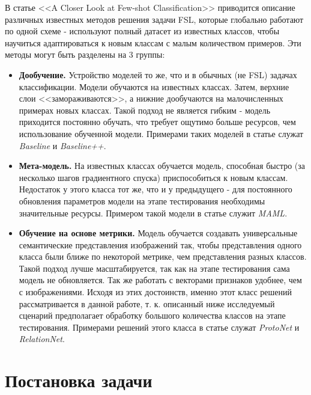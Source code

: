 \documentclass[a4paper, 12pt]{report}
\begin{document}
В статье <<A Closer Look at Few-shot Classification>> \cite{closerlook} приводится описание различных известных методов решения задачи FSL, которые глобально работают по одной схеме - используют полный датасет из известных классов, чтобы научиться адаптироваться к новым классам с малым количеством примеров. Эти методы могут быть разделены на 3 группы:

\begin{itemize}
\item \textbf{Дообучение.} Устройство моделей то же, что и в обычных (не FSL) задачах классификации. Модели обучаются на известных классах. Затем, верхние слои <<замораживаются>>, а нижние дообучаются на малочисленных примерах новых классах. Такой подход не является гибким - модель приходится постоянно обучать, что требует ощутимо больше ресурсов, чем использование обученной модели. Примерами таких моделей в статье служат \textit{Baseline} и \textit{Baseline++}.

\item \textbf{Мета-модель.} На известных классах обучается модель, способная быстро (за несколько шагов градиентного спуска) приспособиться к новым классам. Недостаток у этого класса тот же, что и у предыдущего - для постоянного обновления параметров модели на этапе тестирования необходимы значительные ресурсы. Примером такой модели в статье служит \textit{MAML}.

\item \textbf{Обучение на основе метрики.} Модель обучается создавать универсальные семантические представления изображений так, чтобы представления одного класса были ближе по некоторой метрике, чем представления разных классов. Такой подход лучше масштабируется, так как на этапе тестирования сама модель не обновляется. Так же работать с векторами признаков удобнее, чем с изображениями. Исходя из этих достоинств, именно этот класс решений рассматривается в данной работе, т. к. описанный ниже исследуемый сценарий предполагает обработку большого количества классов на этапе тестирования. Примерами решений этого класса в статье служат \textit{ProtoNet} и \textit{RelationNet}.


\end{itemize}

\chapter{Постановка задачи}
\end{document}
